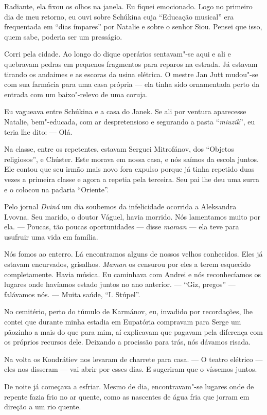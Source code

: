 Radiante, ela fixou os olhos na janela. Eu fiquei emocionado. Logo no
primeiro dia de meu retorno, eu ouvi sobre Schúkina cuja ``Educação
musical'' era frequentada em ``dias ímpares'' por Natalie e sobre o
senhor Siou. Pensei que isso, quem sabe, poderia ser um presságio.

Corri pela cidade. Ao longo do dique operários sentavam"-se aqui e ali e
quebravam pedras em pequenos fragmentos para reparos na estrada. Já
estavam tirando os andaimes e as escoras da usina elétrica. O mestre Jan
Jutt mudou"-se com sua farmácia para uma casa própria --- ela tinha sido
ornamentada perto da entrada com um baixo"-relevo de uma coruja.

Eu vagueava entre Schúkina e a casa do Janek. Se ali por ventura
aparecesse Natalie, bem"-educada, com ar despretensioso e segurando a
pasta ``\emph{miuzik}'', eu teria lhe dito: --- Olá.

Na classe, entre os repetentes, estavam Serguei Mitrofánov, dos
``Objetos religiosos'', e Chúster. Este morava em nossa casa, e nós
saímos da escola juntos. Ele contou que seu irmão mais novo fora expulso
porque já tinha repetido duas vezes a primeira classe e agora a repetia
pela terceira. Seu pai lhe deu uma surra e o colocou na padaria
``Oriente''.

Pelo jornal \emph{Dviná} um dia soubemos da infelicidade ocorrida a
Aleksandra Lvovna. Seu marido, o doutor Váguel, havia morrido. Nós
lamentamos muito por ela. --- Poucas, tão poucas oportunidades --- disse
\emph{maman} --- ela teve para usufruir uma vida em família.

Nós fomos ao enterro. Lá encontramos alguns de nossos velhos conhecidos.
Eles já estavam encurvados, grisalhos. \emph{Maman} os censurou por eles
a terem esquecido completamente. Havia música. Eu caminhava com Andrei e
nós reconhecíamos os lugares onde havíamos estado juntos no ano
anterior. --- ``Giz, pregos'' --- falávamos nós. --- Muita saúde, ``I.
Stúpel''.

No cemitério, perto do túmulo de Karmánov, eu, invadido por recordações,
lhe contei que durante minha estadia em Eupatória compravam para Serge
um pãozinho a mais do que para mim, aí explicavam que pagavam pela
diferença com os próprios recursos dele. Deixando a procissão para trás,
nós dávamos risada.

Na volta os Kondrátiev nos levaram de charrete para casa. --- O teatro
elétrico --- eles nos disseram --- vai abrir por esses dias. E sugeriram
que o víssemos juntos.

De noite já começava a esfriar. Mesmo de dia, encontravam"-se lugares
onde de repente fazia frio no ar quente, como as nascentes de água fria
que jorram em direção a um rio quente.

